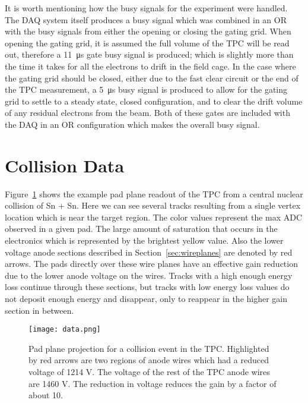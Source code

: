  It is worth mentioning how the busy signals for the experiment were handled. The DAQ system itself produces a busy signal which was combined in an OR with the busy signals from either the opening or closing the gating grid. When opening the gating grid, it is assumed the full volume of the TPC will be read out, therefore  a \SI{11}{\micro\second} gate busy signal is produced; which is slightly more than the time it takes for all the electrons to drift in the field cage. In the case where the gating grid should be closed, either due to the fast clear circuit or the end of the TPC measurement, a \SI{5}{\micro\second} busy signal is produced to allow for the gating grid to settle to a steady state, closed configuration, and to clear the drift volume of any residual electrons from the beam. Both of these gates are included with the DAQ in an OR configuration which makes the overall busy signal. 
 


\section{Collision Data}

Figure~\ref{fig:data} shows the example pad plane readout of the TPC from a central nuclear collision of Sn + Sn. Here we can see several tracks resulting from a single vertex location which is near the target region. The color values represent the max ADC observed in a given pad. The large amount of saturation that occurs in the electronics which is represented by the brightest yellow value. Also the lower voltage anode sections described in Section~\ref{sec:wireplanes} are denoted by red arrows. The pads directly over these wire planes have an effective gain reduction due to the lower anode voltage on the wires. Tracks with a high enough energy loss continue through these sections, but tracks with low energy loss values do not deposit enough energy and disappear, only to reappear in the higher gain section in between. 

\begin{figure}[!htb]
\centering
\texttt{[image: data.png]}
\caption{Pad plane projection for a collision event in the TPC. Highlighted by red arrows are two regions of anode wires which had a reduced voltage of 1214 V. The voltage of the rest of the TPC anode wires are 1460 V. The reduction in voltage reduces the gain by a factor of about 10. }
\label{fig:data}
\end{figure}



